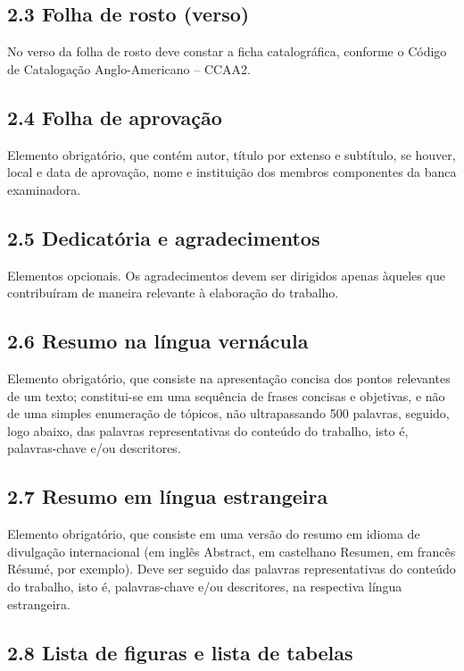 \documentclass[
	12pt,				%
	oneside,			%
	a4paper,			%
	english,			%
	brazil				%
	]{abntex2ppgsi}
\begin{document}
\begin{anexosenv}
\subsection*{2.3 Folha de rosto (verso)}

No verso da folha de rosto deve constar a ficha catalográfica, conforme o Código de Catalogação Anglo-Americano – CCAA2.

\subsection*{2.4 Folha de aprovação}

Elemento obrigatório, que contém autor, título por extenso e subtítulo, se houver, local e data de aprovação, nome e instituição dos membros componentes da banca examinadora.

\subsection*{2.5 Dedicatória e agradecimentos}

Elementos opcionais. Os agradecimentos devem ser dirigidos apenas àqueles que contribuíram de maneira relevante à elaboração do trabalho.

\subsection*{2.6 Resumo na língua vernácula}

Elemento obrigatório, que consiste na apresentação concisa dos pontos relevantes de um texto; constitui-se em uma sequência de frases concisas e objetivas, e não de uma simples enumeração de tópicos, não ultrapassando 500 palavras, seguido, logo abaixo, das palavras representativas do conteúdo do trabalho, isto é, palavras-chave e/ou descritores.

\subsection*{2.7 Resumo em língua estrangeira}

Elemento obrigatório, que consiste em uma versão do resumo em idioma de divulgação internacional (em inglês Abstract, em castelhano Resumen, em francês Résumé, por exemplo). Deve ser seguido das palavras representativas do conteúdo do trabalho, isto é, palavras-chave e/ou descritores, na respectiva língua estrangeira.

\subsection*{2.8 Lista de figuras e lista de tabelas}


\end{anexosenv}
\end{document}
